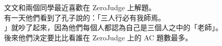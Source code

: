 文文和兩個同學最近喜歡在 ZeroJudge 上解題。\\
有一天他們看到了孔子說的：「三人行必有我師焉。\\
」就吵了起來，因為他們每個人都認為自己是三個人之中的「老師」。\\
後來他們決定要比比看誰在 ZeroJudge 上的 AC 題數最多。\\
